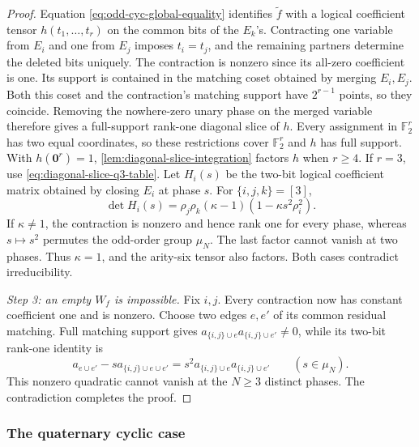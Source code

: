 \documentclass[11pt,letterpaper,onecolumn]{article}
\theoremstyle{plain}
\theoremstyle{definition}
\theoremstyle{remark}
\newcommand{\Ftwo}{\mathbb F_2}
\newcommand{\zero}{\mathbf 0}
\begin{document}
\begin{proof}
		Equation \eqref{eq:odd-cyc-global-equality} identifies \(\widetilde f\)
		with a logical coefficient tensor \(h(t_1,\ldots,t_r)\) on the common bits of the
		\(E_k\)'s.  Contracting one variable from \(E_i\) and one from \(E_j\) imposes
		\(t_i=t_j\), and the remaining partners determine the deleted bits uniquely.
		The contraction is nonzero since its all-zero coefficient is one.  Its support is
		contained in the matching coset obtained by merging \(E_i,E_j\).  Both this
		coset and the contraction's matching support have \(2^{r-1}\) points, so they
		coincide.  Removing the nowhere-zero unary phase on the merged variable
		therefore gives a full-support rank-one diagonal slice of \(h\).  Every assignment in \(\Ftwo^r\) has two equal coordinates, so these
		restrictions cover \(\Ftwo^r\) and \(h\) has full support.  With \(h(\zero^r)=1\),
		\cref{lem:diagonal-slice-integration} factors \(h\) when \(r\ge4\).  If
		\(r=3\), use \cref{eq:diagonal-slice-q3-table}.  Let \(H_i(s)\) be the
		two-bit logical coefficient matrix obtained by closing \(E_i\) at phase \(s\).  For
		\(\{i,j,k\}=[3]\),
		\begin{equation*}
			\det H_i(s)=\rho_j\rho_k(\kappa-1)
			(1-\kappa s^2\rho_i^2).
		\end{equation*}
		If \(\kappa\ne1\), the contraction is nonzero and hence rank one for every phase,
		whereas \(s\mapsto s^2\) permutes the odd-order group \(\mu_N\). The last
		factor cannot vanish at two phases.  Thus \(\kappa=1\), and the arity-six
		tensor also factors.  Both cases contradict irreducibility.
		
		\emph{Step 3: an empty \(W_f\) is impossible.}
		Fix \(i,j\).  Every contraction now has constant coefficient one and is nonzero.
		Choose two edges \(e,e'\) of its common residual matching.  Full matching
		support gives
		\(a_{\{i,j\}\cup e}a_{\{i,j\}\cup e'}\ne0\), while its two-bit rank-one
		identity is
		\begin{equation*}
			a_{e\cup e'}-s a_{\{i,j\}\cup e\cup e'}
			=s^2a_{\{i,j\}\cup e}a_{\{i,j\}\cup e'}
			\qquad(s\in\mu_N).
		\end{equation*}
		This nonzero quadratic cannot vanish at the \(N\ge3\) distinct phases.
		The contradiction completes the proof.
	\end{proof}
	
	\subsubsection{The quaternary cyclic case}
	\label{subsec:odd-cyc-quaternary}
	
\end{document}
